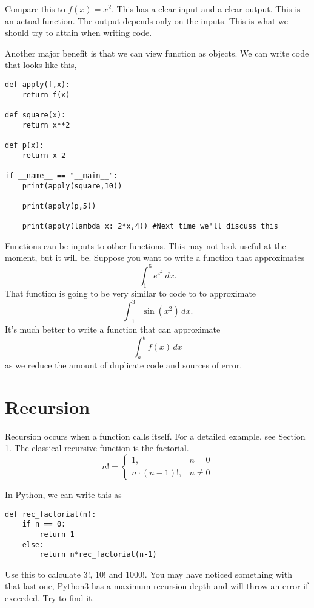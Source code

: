 \documentclass[11pt,letterpaper]{article}
\begin{document}
Compare this to $f(x)=x^2$. This has a clear input and a clear output. This is an actual function. 
The output depends only on the inputs. This is what we should try to attain when writing code. 

Another major benefit is that we can view function as objects. We can write code that looks like this,
\begin{verbatim}
def apply(f,x):
    return f(x)

def square(x):
    return x**2

def p(x):
    return x-2

if __name__ == "__main__":
    print(apply(square,10))

    print(apply(p,5))

    print(apply(lambda x: 2*x,4)) #Next time we'll discuss this
\end{verbatim}
Functions can be inputs to other functions. This may not look useful at the moment, but it will be.
Suppose you want to write a function that approximates 
\[
\int_1^6 e^{x^2}\,dx.
\]
That function is going to be very similar to code to to approximate
\[
\int_{-1}^3 \sin(x^2)\,dx.
\]
It's much better to write a function that can approximate
\[
\int_a^b f(x)\,dx
\]
as we reduce the amount of duplicate code and sources of error.



\section{Recursion}

\label{sec:recursion}

Recursion occurs when a function calls itself. For a detailed example, see Section \ref{sec:recursion}.
The classical recursive function is the factorial.
\begin{equation*}
 n! = \left\{\begin{array}{cc} 1, & n=0 \\ n\cdot(n-1)!, &n\ne 0\end{array}\right.
\end{equation*}


In Python, we can write this as
\begin{verbatim}
def rec_factorial(n):
    if n == 0:
        return 1
    else:
        return n*rec_factorial(n-1)
\end{verbatim}
Use this to calculate $3!$, $10!$ and $1000!$. You may have noticed something with that last one,
Python3 has a maximum recursion depth and will throw an error if exceeded. Try to find it.
\end{document}
